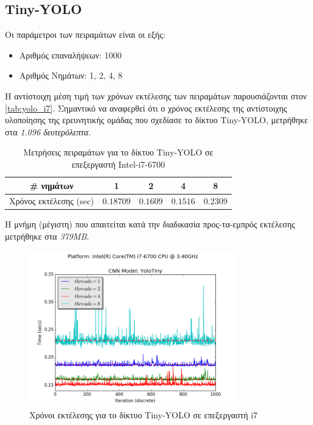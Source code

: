 
\subsection{Tiny-YOLO}

Οι παράμετροι των πειραμάτων είναι οι εξής:
\begin{itemize}
  \item{Αριθμός επαναλήψεων: 1000}
  \item{Αριθμός Νημάτων: 1, 2, 4, 8}
\end{itemize}

Η αντίστοιχη μέση τιμή των χρόνων εκτέλεσης των πειραμάτων παρουσιάζονται στον \autoref{tab:yolo_i7}.
Σημαντικό να αναφερθεί ότι ο χρόνος εκτέλεσης της αντίστοιχης υλοποίησης της ερευνητικής ομάδας
που σχεδίασε το δίκτυο Tiny-YOLO, μετρήθηκε στα \emph{1.096 δευτερόλεπτα}.

\begin{table}[H]
  \begin{center}
    \caption{Μετρήσεις πειραμάτων για το δίκτυο Tiny-YOLO σε επεξεργαστή Intel-i7-6700}
    \label{tab:yolo_i7}
    \begin{tabular}{ | c | c | c | c | c | }
      \hline
      \rowcolor{Gray}
      \# νημάτων & 1 & 2 & 4 & 8 \\
      \hline
      Χρόνος εκτέλεσης (sec) & $0.18709$ & $0.1609$ & $0.1516$ & $0.2309$ \\
      \hline
    \end{tabular}
  \end{center}
\end{table}
Η μνήμη (μέγιστη) που απαιτείται κατά την διαδικασία
προς-τα-εμπρός εκτέλεσης μετρήθηκε στα \emph{379MB}.

\begin{figure}[H]
  \centering
  \includegraphics[width=0.8\textwidth]{./images/chapter6/benchmark_yolotiny_i7.png}
  \caption[Χρόνoι εκτέλεσης για το δίκτυο Tiny-YOLO σε επεξεργαστή i7]{Χρόνοι εκτέλεσης για το δίκτυο Tiny-YOLO σε επεξεργαστή i7}
  \label{fig:yolotiny_results_i7}
\end{figure}


